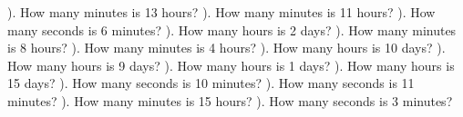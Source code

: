 \documentclass{article}%
\begin{document}
\newline%
\newline%
). How many minutes is 13 hours?%
\newline%
\newline%
). How many minutes is 11 hours?%
\newline%
\newline%
). How many seconds is 6 minutes?%
\newline%
\newline%
). How many hours is 2 days?%
\newline%
\newline%
). How many minutes is 8 hours?%
\newline%
\newline%
). How many minutes is 4 hours?%
\newline%
\newline%
). How many hours is 10 days?%
\newline%
\newline%
). How many hours is 9 days?%
\newline%
\newline%
). How many hours is 1 days?%
\newline%
\newline%
). How many hours is 15 days?%
\newline%
\newline%
). How many seconds is 10 minutes?%
\newline%
\newline%
). How many seconds is 11 minutes?%
\newline%
\newline%
). How many minutes is 15 hours?%
\newline%
\newline%
). How many seconds is 3 minutes?%
\newline%
\end{document}
